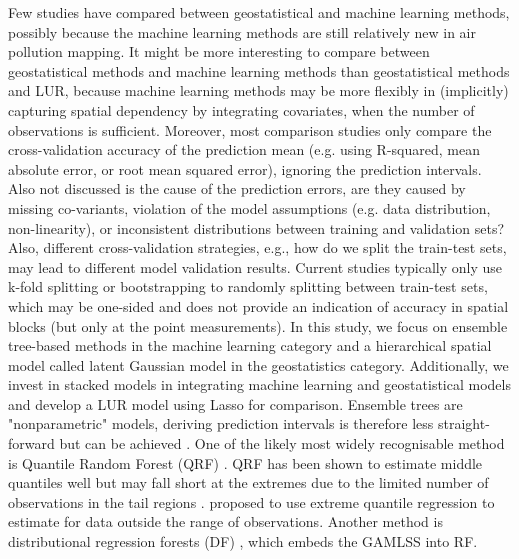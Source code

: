 \documentclass{article}
\begin{document}
Few studies have compared between geostatistical and machine learning methods, possibly because the machine learning methods are still relatively new in air pollution mapping. It might be more interesting to compare between geostatistical methods and machine learning methods than geostatistical methods and LUR, because machine learning methods may be more flexibly in (implicitly) capturing spatial dependency by integrating covariates, when the number of observations is sufficient. Moreover, most comparison studies only compare the cross-validation accuracy of the prediction mean (e.g. using R-squared, mean absolute error, or root mean squared error), ignoring the prediction intervals. Also not discussed is the cause of the prediction errors, are they caused by missing co-variants, violation of the model assumptions (e.g. data distribution, non-linearity), or inconsistent distributions between training and validation sets? Also, different cross-validation strategies, e.g., how do we split the train-test sets, may lead to different model validation results. Current studies typically only use k-fold splitting \citep{kerckhoffs2019performance,larkin2017global,REN2020105827} or bootstrapping \citep{luglobal} to randomly splitting between train-test sets, which may be one-sided and does not provide an indication of accuracy in spatial blocks (but only at the point measurements). In this study, we focus on ensemble tree-based methods in the machine learning category and a hierarchical spatial model \citep{lindgren2011explicit} called latent Gaussian model in the geostatistics category. Additionally, we invest in stacked models in integrating machine learning and geostatistical models and develop a LUR model using Lasso for comparison.  
Ensemble trees are "nonparametric" models, deriving prediction intervals is therefore less straight-forward but can be achieved \citep{meinshausen2006quantile,wager2014confidence,stasinopoulos2007generalized,velthoen2021gradient}. One of the likely most widely recognisable method is Quantile Random Forest (QRF) \citep{meinshausen2006quantile}. QRF has been shown to estimate middle quantiles well but may fall short at the extremes due to the limited number of observations in the tail regions \citep{velthoen2021gradient}. \cite{velthoen2021gradient} proposed to use extreme quantile regression to estimate for data outside the range of observations. Another method is distributional regression forests (DF) \citep{schlosser2019distributional}, which embeds the GAMLSS \citep{stasinopoulos2007generalized} into RF.  
\end{document}
